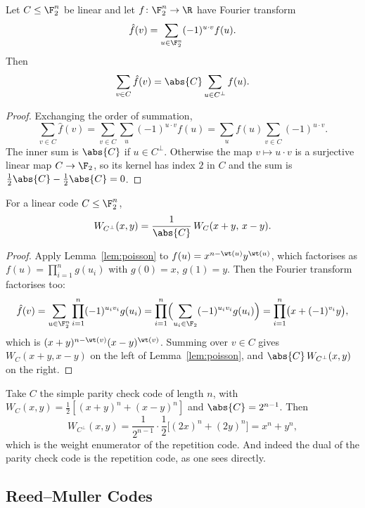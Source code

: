 \begin{lemma}\label{lem:poisson}
	Let $C \le \F_2^n$ be linear and let $f\colon \F_2^n \to \R$ have Fourier transform
	$$\hat f(v) = \sum_{u \in \F_2^n}(-1)^{u\cdot v}f(u).$$
	Then
	$$\sum_{v \in C}\hat f(v) = \abs{C}\sum_{u \in C^\perp}f(u).$$
\end{lemma}

\begin{proof}
	Exchanging the order of summation,
	$$\sum_{v\in C}\hat f(v) = \sum_{v\in C}\sum_{u}(-1)^{u\cdot v}f(u) = \sum_u f(u)\sum_{v\in C}(-1)^{u\cdot v}.$$
	The inner sum is $\abs{C}$ if $u \in C^\perp$. Otherwise the map $v \mapsto u\cdot v$ is a surjective linear map $C \to \F_2$, so its kernel has index $2$ in $C$ and the sum is $\tfrac12\abs{C} - \tfrac12\abs{C} = 0$.
\end{proof}

\begin{theorem}
	For a linear code $C \le \F_2^n$,
	$$W_{C^\perp}(x,y) = \frac{1}{\abs{C}}\,W_C(x+y,\,x-y).$$
\end{theorem}

\begin{proof}
	Apply Lemma~\ref{lem:poisson} to $f(u) = x^{n-\wt(u)}y^{\wt(u)}$, which factorises as $f(u) = \prod_{i=1}^n g(u_i)$ with $g(0)=x$, $g(1)=y$. Then the Fourier transform factorises too:
	$$\hat f(v) = \sum_{u\in\F_2^n}\prod_{i=1}^n(-1)^{u_iv_i}g(u_i) = \prod_{i=1}^n\Bigl(\sum_{u_i \in \F_2}(-1)^{u_iv_i}g(u_i)\Bigr) = \prod_{i=1}^n\bigl(x+(-1)^{v_i}y\bigr),$$
	which is $(x+y)^{n-\wt(v)}(x-y)^{\wt(v)}$. Summing over $v \in C$ gives $W_C(x+y,x-y)$ on the left of Lemma~\ref{lem:poisson}, and $\abs{C}\,W_{C^\perp}(x,y)$ on the right.
\end{proof}

\begin{example}
	Take $C$ the simple parity check code of length $n$, with $W_C(x,y) = \tfrac12[(x+y)^n+(x-y)^n]$ and $\abs{C}=2^{n-1}$. Then
	$$W_{C^\perp}(x,y) = \frac{1}{2^{n-1}}\cdot\frac12\bigl[(2x)^n + (2y)^n\bigr] = x^n+y^n,$$
	which is the weight enumerator of the repetition code. And indeed the dual of the parity check code is the repetition code, as one sees directly.
\end{example}

\subsection{Reed--Muller Codes}

